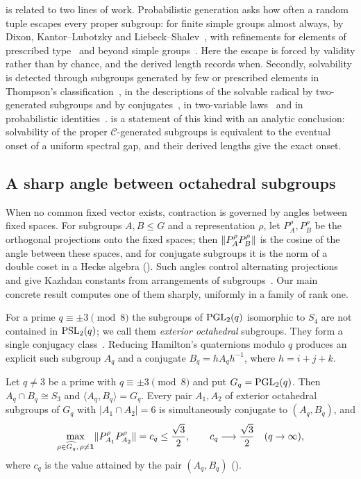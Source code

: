  is related to two lines of work. Probabilistic generation
asks how often a random tuple escapes every proper subgroup: for finite
simple groups almost always, by Dixon, Kantor--Lubotzky and
Liebeck--Shalev~\cite{Dixon1969,KantorLubotzky1990,LiebeckShalev1995},
with refinements for elements of prescribed
type~\cite{LiebeckShalev1996,Burness2019} and beyond simple
groups~\cite{HarperQuick2026}. Here the escape is forced by validity
rather than by chance, and the derived length records when. Secondly,
solvability is detected through subgroups generated by few or prescribed
elements in Thompson's classification~\cite{Thompson1968}, in the
descriptions of the solvable radical by two-generated subgroups and by
conjugates~\cite{GKPS2006,GGKP2008}, in two-variable
laws~\cite{Bandman2006,BrayWilsonWilson2005} and in probabilistic
identities~\cite{LarsenShalev2016}.  is a statement of this
kind with an analytic conclusion: solvability of the proper
$\mathcal C$-generated subgroups is equivalent to the eventual onset of a
uniform spectral gap, and their derived lengths give the exact onset.

\subsection*{A sharp angle between octahedral subgroups}
When no common fixed vector exists, contraction is governed by angles
between fixed spaces. For subgroups $A,B\le G$ and a representation
$\rho$, let $P_A^\rho,P_B^\rho$ be the orthogonal projections onto the
fixed spaces; then $\lVert P_A^\rho P_B^\rho \rVert$ is the cosine of the angle
between these spaces, and for conjugate subgroups it is the norm of a
double coset in a Hecke algebra (). Such
angles control alternating
projections~\cite{KayalarWeinert1988,BadeaGrivauxMuller2010} and give
Kazhdan constants from arrangements of
subgroups~\cite{Kassabov2011}. Our main concrete result computes one of
them sharply, uniformly in a family of rank one.

For a prime $q\equiv\pm3\pmod 8$ the subgroups of $\operatorname{PGL}_2(q)$ isomorphic
to $S_4$ are not contained in $\operatorname{PSL}_2(q)$; we call them \emph{exterior
octahedral} subgroups. They form a single conjugacy
class~\cite{Huppert1967,King2005,Giudici2007}. Reducing Hamilton's
quaternions modulo $q$ produces an explicit such subgroup $A_q$ and a
conjugate $B_q=hA_qh^{-1}$, where $h=i+j+k$.

\begin{lettertheorem}
\label{ithm:B}
Let $q\ne3$ be a prime with $q\equiv\pm3\pmod8$ and put $G_q=\operatorname{PGL}_2(q)$.
Then $A_q\cap B_q\cong S_3$ and $\langle A_q,B_q\rangle=G_q$. Every pair
$A_1,A_2$ of exterior octahedral subgroups of $G_q$ with
$|A_1\cap A_2|=6$ is simultaneously conjugate to $(A_q,B_q)$, and
\[
 \max_{\rho\in\widehat{G_q},\,\rho\ne\mathbf1}
              \lVert P_{A_1}^\rho P_{A_2}^\rho \rVert=c_q\le\frac{\sqrt3}{2},
 \qquad c_q\longrightarrow\frac{\sqrt3}{2}\quad(q\to\infty),
\]
where $c_q$ is the value attained by the pair $(A_q,B_q)$
\textup{()}.
\end{lettertheorem}

